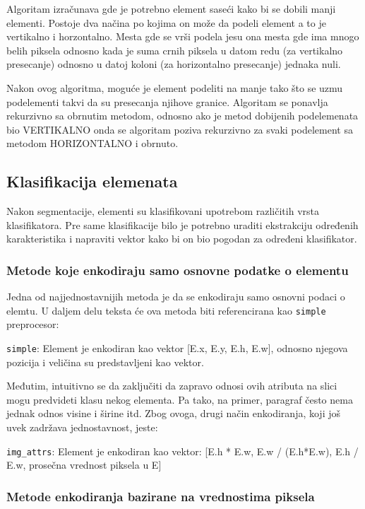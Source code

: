 \documentclass[]{amsart}
\begin{document}
Algoritam izračunava gde je potrebno element saseći kako bi se dobili manji elementi. Postoje dva načina po kojima on može da podeli element a to je
vertikalno i horzontalno. Mesta gde se vrši podela jesu ona mesta gde ima mnogo belih piksela odnosno kada je suma crnih piksela u datom redu (za vertikalno presecanje)
odnosno u datoj koloni (za horizontalno presecanje) jednaka nuli.

Nakon ovog algoritma, moguće je element podeliti na manje tako što se uzmu podelementi takvi da su presecanja njihove granice. Algoritam se ponavlja rekurzivno
sa obrnutim metodom, odnosno ako je metod dobijenih podelemenata bio VERTIKALNO onda se algoritam poziva rekurzivno za svaki podelement sa metodom HORIZONTALNO
i obrnuto. 

\subsection{Klasifikacija elemenata}
\label{sec:org4f634b4}

Nakon segmentacije, elementi su klasifikovani upotrebom različitih vrsta klasifikatora. Pre same klasifikacije bilo je potrebno uraditi ekstrakciju
određenih karakteristika i napraviti vektor kako bi on bio pogodan za određeni klasifikator.




\subsubsection{Metode koje enkodiraju samo osnovne podatke o elementu}
\label{sec:orgd93cd26}

Jedna od najjednostavnijih metoda je da se enkodiraju samo osnovni podaci o elemtu. U daljem delu teksta će ova metoda biti referencirana kao \texttt{simple} preprocesor:

\texttt{simple}: Element je enkodiran kao vektor [E.x, E.y, E.h, E.w], odnosno njegova pozicija i veličina su predstavljeni kao vektor.


Međutim, intuitivno se da zaključiti da zapravo odnosi ovih atributa na slici mogu predvideti klasu nekog elementa. Pa tako, na primer, paragraf
često nema jednak odnos visine i širine itd. Zbog ovoga, drugi način enkodiranja, koji još uvek zadržava jednostavnost, jeste:

\texttt{img\_attrs}: Element je enkodiran kao vektor:  [E.h * E.w, E.w / (E.h*E.w), E.h / E.w, prosečna vrednost piksela u E]

\subsubsection{Metode enkodiranja bazirane na vrednostima piksela}
\label{sec:org582acb2}
\end{document}
